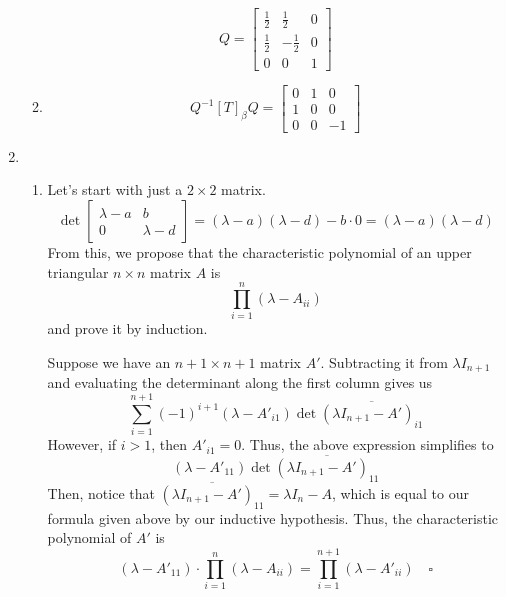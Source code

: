\documentclass[12pt]{article}
\begin{document}
\begin{enumerate}
\begin{enumerate}
                        \[Q=\begin{bmatrix}
                                    \frac{1}{2} & \frac{1}{2}  & 0 \\
                                    \frac{1}{2} & -\frac{1}{2} & 0 \\
                                    0           & 0            & 1
                              \end{bmatrix}\]
                  \item \[Q^{-1}[T]_\beta Q=\begin{bmatrix}
                                    0 & 1 & 0  \\
                                    1 & 0 & 0  \\
                                    0 & 0 & -1
                              \end{bmatrix}\]
            \end{enumerate}
      \item \begin{enumerate}
                  \item Let's start with just a $2 \times 2$ matrix.
                        \[\det \begin{bmatrix}
                                    \lambda-a & b         \\
                                    0         & \lambda-d
                              \end{bmatrix}=(\lambda-a)(\lambda-d)-b \cdot 0=(\lambda-a)(\lambda-d)\]
                        From this, we propose that the characteristic polynomial of
                        an upper triangular $n \times n$ matrix $A$ is
                        \[\prod_{i=1}^{n} (\lambda-A_{ii})\]
                        and prove it by induction.

                        Suppose we have an $n+1 \times n+1$ matrix $A'$.
                        Subtracting it from $\lambda I_{n+1}$ and evaluating the determinant along the first column gives us
                        \[\sum_{i=1}^{n+1} (-1)^{i+1} (\lambda-A'_{i1}) \det \overline{(\lambda I_{n+1}-A')_{i1}}\]
                        However, if $i > 1$, then $A'_{i1}=0$.
                        Thus, the above expression simplifies to
                        \[(\lambda-A'_{11}) \det \overline{(\lambda I_{n+1}-A')_{11}}\]
                        Then, notice that $\overline{(\lambda I_{n+1}-A')_{11}}=\lambda I_{n}-A$,
                        which is equal to our formula given above by our inductive hypothesis.
                        Thus, the characteristic polynomial of $A'$ is
                        \[(\lambda-A'_{11}) \cdot \prod_{i=1}^{n} (\lambda-A_{ii})=\prod_{i=1}^{n+1} (\lambda-A'_{ii})\quad\square\]


\end{enumerate}
\end{enumerate}
\end{document}
